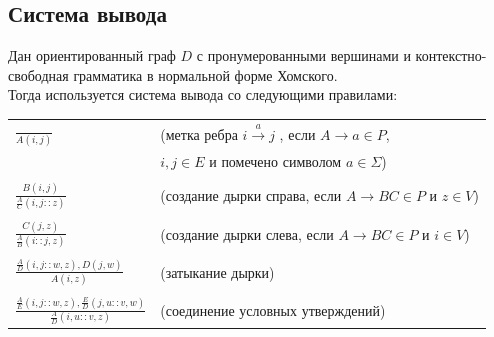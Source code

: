 \subsection {Система вывода}
Дан ориентированный граф $D$ с пронумерованными вершинами и контекстно-свободная грамматика в нормальной форме Хомского.
\\Тогда используется система вывода со следующими правилами:
\begin{table}[ht]
  \centering
  \begin{tabular}[t]{l l}
   $\frac{}{A(i , j)}$ &(метка ребра $i \xrightarrow a j$ , если $A \rightarrow a \in P$,
   \\ &   $i , j \in E$ и помечено символом $a \in \Sigma$)\\
    & \\
   $\frac{B(i , j)}{\frac{A}{C}(i , j :: z)}$  & (создание дырки справа, если  $A \rightarrow BC \in P$ и $z \in V$) \\
   & \\
   $\frac{C(j  , z)}{\frac{A}{B}(i :: j  , z)}$  & (создание дырки слева, если  $A \rightarrow BC \in P$ и $i \in V$) \\
   &\\
   $\frac{\frac{A}{D}(i , j :: w , z), D(j , w)}{A(i  , z)}$  & (затыкание дырки) \\
   &\\
   $\frac{\frac{A}{E}(i , j :: w  , z), \frac{E}{D}( j , u :: v , w)}{\frac{A}{D}(i, u :: v , z)}$  & (соединение условных утверждений) \\


\end{tabular}
\end{table}

